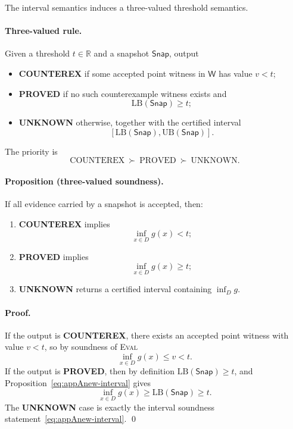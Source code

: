The interval semantics induces a three-valued threshold semantics.

\paragraph{Three-valued rule.}
Given a threshold $t\in\mathbb R$ and a snapshot $\mathsf{Snap}$, output
\begin{itemize}
    \item \textbf{COUNTEREX} if some accepted point witness in $\mathsf W$ has value $v<t$;
    \item \textbf{PROVED} if no such counterexample witness exists and
    \[
    \mathrm{LB}(\mathsf{Snap})\ge t;
    \]
    \item \textbf{UNKNOWN} otherwise, together with the certified interval
    \[
    [\mathrm{LB}(\mathsf{Snap}),\mathrm{UB}(\mathsf{Snap})].
    \]
\end{itemize}
The priority is
\[
\mathrm{COUNTEREX}\ \succ\ \mathrm{PROVED}\ \succ\ \mathrm{UNKNOWN}.
\]

\paragraph{\normalfont Proposition (three-valued soundness).}
If all evidence carried by a snapshot is accepted, then:
\begin{enumerate}
    \item \textbf{COUNTEREX} implies
    \[
    \inf_{x\in D} g(x)< t;
    \]
    \item \textbf{PROVED} implies
    \[
    \inf_{x\in D} g(x)\ge t;
    \]
    \item \textbf{UNKNOWN} returns a certified interval containing $\inf_D g$.
\end{enumerate}

\paragraph{\normalfont Proof.}
If the output is \textbf{COUNTEREX}, there exists an accepted point witness with value $v<t$, so by soundness of \textsc{Eval}
\[
\inf_{x\in D} g(x)\le v<t.
\]
If the output is \textbf{PROVED}, then by definition $\mathrm{LB}(\mathsf{Snap})\ge t$, and Proposition~\eqref{eq:appAnew-interval} gives
\[
\inf_{x\in D} g(x)\ge \mathrm{LB}(\mathsf{Snap})\ge t.
\]
The \textbf{UNKNOWN} case is exactly the interval soundness statement~\eqref{eq:appAnew-interval}. \qed

